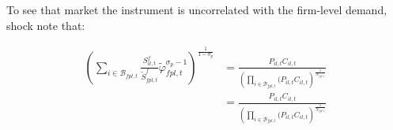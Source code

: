 To see that market the instrument is uncorrelated with the firm-level demand, shock note that: 

\begin{linenomath*}
    \begin{equation*}
        \begin{aligned}
            \left(\sum_{i \in \mathcal{B}_{fpl,t}} \frac{S^f_{il,t}}{\tilde{S}^f_{fpl,t}} \tilde{\varphi}_{fpl,t}^{\sigma_p-1}\right)^{\frac{1}{1-\sigma_p}}
                &=  \frac{P_{il,t}C_{il,t}}
                         {  \left(
                                \prod_{i \in \mathcal{B}_{fpl,t}} \bigg(P_{il,t}C_{il,t}
                            \right)^{\frac{1}{N_{fpl,t}}}} \\
                &=  \frac{P_{il,t}C_{il,t}}
                {           \left(
                                \prod_{i \in \mathcal{B}_{fpl,t}} \bigg(P_{il,t}C_{il,t}
                            \right)^{\frac{1}{N_{fpl,t}}}}
        \end{aligned}
    \end{equation*}
\end{linenomath*}